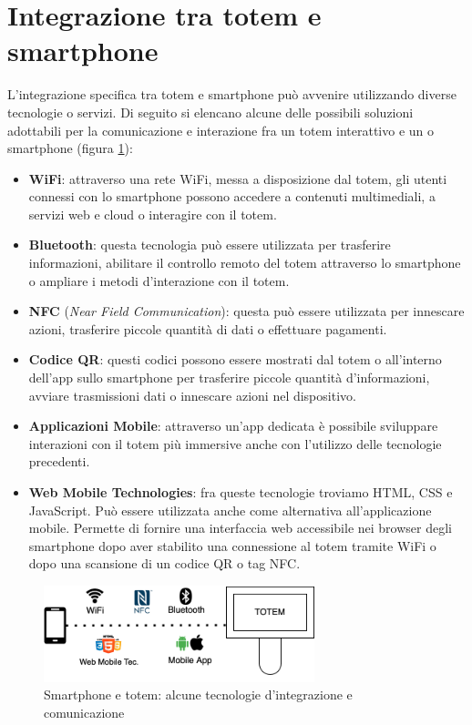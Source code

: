 \section{Integrazione tra totem e smartphone}
L'integrazione specifica tra totem e smartphone può avvenire utilizzando diverse tecnologie o servizi. Di seguito si elencano alcune delle possibili soluzioni adottabili per la comunicazione e interazione fra un totem interattivo e un o smartphone (figura \ref{fig:totem-phone-tech}):

\begin{itemize}
    \item \textbf{WiFi}: attraverso una rete WiFi, messa a disposizione dal totem, gli utenti connessi con lo smartphone possono accedere a contenuti multimediali, a servizi web e cloud o interagire con il totem.
    \item \textbf{Bluetooth}: questa tecnologia può essere utilizzata per trasferire informazioni, abilitare il controllo remoto del totem attraverso lo smartphone o ampliare i metodi d'interazione con il totem.
    \item \textbf{NFC} (\textit{Near Field Communication}): questa può essere utilizzata per innescare azioni, trasferire piccole quantità di dati o effettuare pagamenti.
    \item \textbf{Codice QR}: questi codici possono essere mostrati dal totem o all'interno dell'app sullo smartphone per trasferire piccole quantità d'informazioni, avviare trasmissioni dati o innescare azioni nel dispositivo.
    \item \textbf{Applicazioni Mobile}: attraverso un'app dedicata è possibile sviluppare interazioni con il totem più immersive anche con l'utilizzo delle tecnologie precedenti.
    \item \textbf{Web Mobile Technologies}: fra queste tecnologie troviamo HTML, CSS e JavaScript. Può essere utilizzata anche come alternativa all'applicazione mobile. Permette di fornire una interfaccia web accessibile nei browser degli smartphone dopo aver stabilito una connessione al totem tramite WiFi o dopo una scansione di un codice QR o tag NFC.
\end{itemize}

\begin{figure}
    \centering
    \includegraphics[width=0.7\textwidth]{img/totem-smartphone-tecnologies.png}
    \caption{Smartphone e totem: alcune tecnologie d'integrazione e comunicazione}
    \label{fig:totem-phone-tech}
\end{figure}
